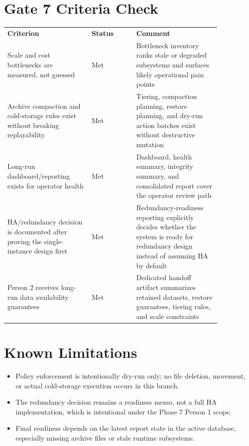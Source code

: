 \documentclass{article}
\begin{document}
\section*{Gate 7 Criteria Check}
\begin{longtable}{p{0.34\linewidth}p{0.18\linewidth}p{0.34\linewidth}}
\textbf{Criterion} & \textbf{Status} & \textbf{Comment} \\
Scale and cost bottlenecks are measured, not guessed & Met & Bottleneck inventory ranks stale or degraded subsystems and surfaces likely operational pain points \\
Archive compaction and cold-storage rules exist without breaking replayability & Met & Tiering, compaction planning, restore planning, and dry-run action batches exist without destructive mutation \\
Long-run dashboard/reporting exists for operator health & Met & Dashboard, health summary, integrity summary, and consolidated report cover the operator review path \\
HA/redundancy decision is documented after proving the single-instance design first & Met & Redundancy-readiness reporting explicitly decides whether the system is ready for redundancy design instead of assuming HA by default \\
Person 2 receives long-run data availability guarantees & Met & Dedicated handoff artifact summarizes retained datasets, restore guarantees, tiering rules, and scale constraints \\
\end{longtable}

\section*{Known Limitations}
\begin{itemize}
\item Policy enforcement is intentionally dry-run only; no file deletion, movement, or actual cold-storage execution occurs in this branch.
\item The redundancy decision remains a readiness memo, not a full HA implementation, which is intentional under the Phase 7 Person 1 scope.
\item Final readiness depends on the latest report state in the active database, especially missing archive files or stale runtime subsystems.
\end{itemize}
\end{document}
